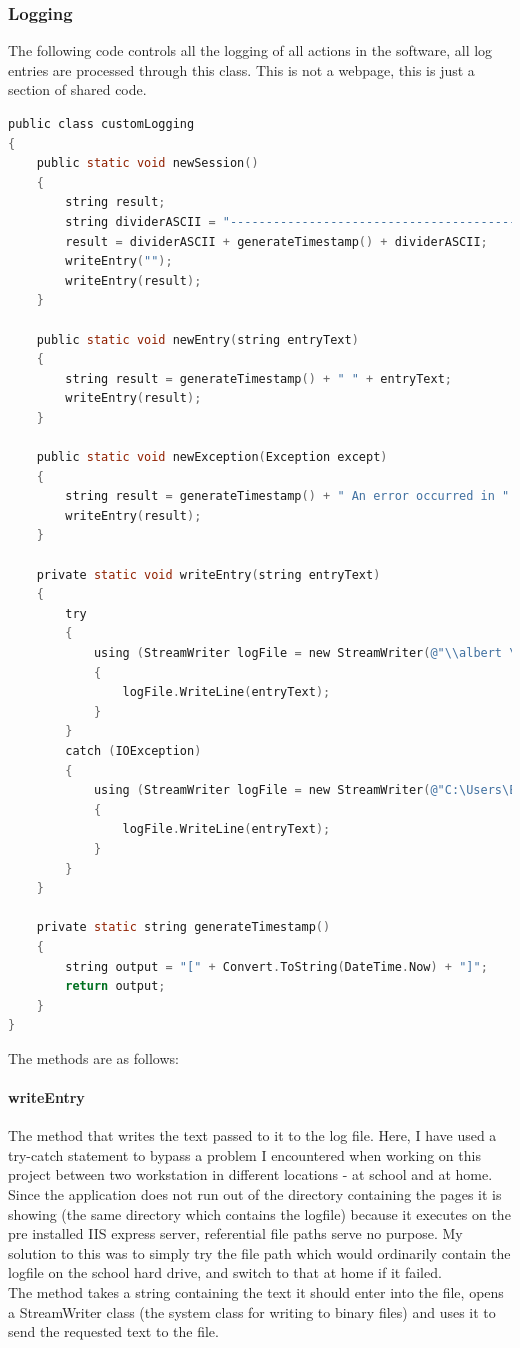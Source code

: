 ﻿\documentclass{article}
\begin{document}
    \subsubsection{Logging}
    The following code controls all the logging of all actions in the software, all log entries are processed through this class.
    This is not a webpage, this is just a section of shared code.
    \begin{lstlisting}[language=C]
public class customLogging
{
    public static void newSession()
    {
        string result;
        string dividerASCII = "------------------------------------------";
        result = dividerASCII + generateTimestamp() + dividerASCII;
        writeEntry("");
        writeEntry(result);
    }

    public static void newEntry(string entryText)
    {
        string result = generateTimestamp() + " " + entryText;
        writeEntry(result);
    }

    public static void newException(Exception except)
    {
        string result = generateTimestamp() + " An error occurred in " + except.Source + " with message " + except.Message;
        writeEntry(result);
    }

    private static void writeEntry(string entryText)
    {
        try
        {
            using (StreamWriter logFile = new StreamWriter(@"\\albert \2011\R04637\Computer Science\coursework\mainCoursework\App_Data\log.txt", true))
            {
                logFile.WriteLine(entryText);
            }
        }
        catch (IOException)
        {
            using (StreamWriter logFile = new StreamWriter(@"C:\Users\Edward\Source\Repos\coursework\mainCoursework\App_Data\log.txt", true))
            {
                logFile.WriteLine(entryText);
            }
        }
    }

    private static string generateTimestamp()
    {
        string output = "[" + Convert.ToString(DateTime.Now) + "]";
        return output;
    }
}
    \end{lstlisting}
    The methods are as follows:
    \paragraph{writeEntry} The method that writes the text passed to it to the log file.
    Here, I have used a try-catch statement to bypass a problem I encountered when working on this project between two workstation in different locations - at school and at home.
    Since the application does not run out of the directory containing the pages it is showing (the same directory which contains the logfile) because it executes on the pre installed IIS express server, referential file paths serve no purpose.
    My solution to this was to simply try the file path which would ordinarily contain the logfile on the school hard drive, and switch to that at home if it failed.
    \\
    The method takes a string containing the text it should enter into the file, opens a StreamWriter class (the system class for writing to binary files) and uses it to send the requested text to the file.
\end{document}
